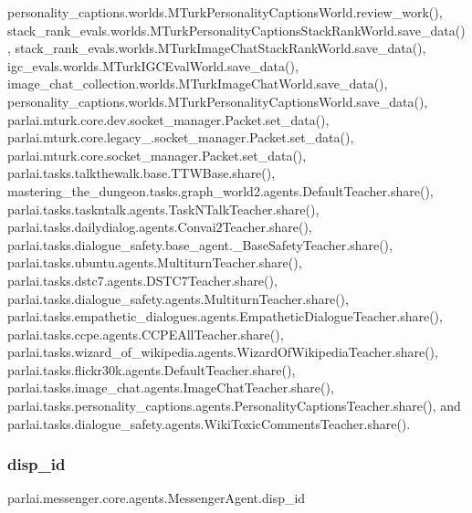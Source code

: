 personality\+\_\+captions.\+worlds.\+M\+Turk\+Personality\+Captions\+World.\+review\+\_\+work(), stack\+\_\+rank\+\_\+evals.\+worlds.\+M\+Turk\+Personality\+Captions\+Stack\+Rank\+World.\+save\+\_\+data(), stack\+\_\+rank\+\_\+evals.\+worlds.\+M\+Turk\+Image\+Chat\+Stack\+Rank\+World.\+save\+\_\+data(), igc\+\_\+evals.\+worlds.\+M\+Turk\+I\+G\+C\+Eval\+World.\+save\+\_\+data(), image\+\_\+chat\+\_\+collection.\+worlds.\+M\+Turk\+Image\+Chat\+World.\+save\+\_\+data(), personality\+\_\+captions.\+worlds.\+M\+Turk\+Personality\+Captions\+World.\+save\+\_\+data(), parlai.\+mturk.\+core.\+dev.\+socket\+\_\+manager.\+Packet.\+set\+\_\+data(), parlai.\+mturk.\+core.\+legacy\+\_.\+socket\+\_\+manager.\+Packet.\+set\+\_\+data(), parlai.\+mturk.\+core.\+socket\+\_\+manager.\+Packet.\+set\+\_\+data(), parlai.\+tasks.\+talkthewalk.\+base.\+T\+T\+W\+Base.\+share(), mastering\+\_\+the\+\_\+dungeon.\+tasks.\+graph\+\_\+world2.\+agents.\+Default\+Teacher.\+share(), parlai.\+tasks.\+taskntalk.\+agents.\+Task\+N\+Talk\+Teacher.\+share(), parlai.\+tasks.\+dailydialog.\+agents.\+Convai2\+Teacher.\+share(), parlai.\+tasks.\+dialogue\+\_\+safety.\+base\+\_\+agent.\+\_\+\+Base\+Safety\+Teacher.\+share(), parlai.\+tasks.\+ubuntu.\+agents.\+Multiturn\+Teacher.\+share(), parlai.\+tasks.\+dstc7.\+agents.\+D\+S\+T\+C7\+Teacher.\+share(), parlai.\+tasks.\+dialogue\+\_\+safety.\+agents.\+Multiturn\+Teacher.\+share(), parlai.\+tasks.\+empathetic\+\_\+dialogues.\+agents.\+Empathetic\+Dialogue\+Teacher.\+share(), parlai.\+tasks.\+ccpe.\+agents.\+C\+C\+P\+E\+All\+Teacher.\+share(), parlai.\+tasks.\+wizard\+\_\+of\+\_\+wikipedia.\+agents.\+Wizard\+Of\+Wikipedia\+Teacher.\+share(), parlai.\+tasks.\+flickr30k.\+agents.\+Default\+Teacher.\+share(), parlai.\+tasks.\+image\+\_\+chat.\+agents.\+Image\+Chat\+Teacher.\+share(), parlai.\+tasks.\+personality\+\_\+captions.\+agents.\+Personality\+Captions\+Teacher.\+share(), and parlai.\+tasks.\+dialogue\+\_\+safety.\+agents.\+Wiki\+Toxic\+Comments\+Teacher.\+share().

\mbox{\label{classparlai_1_1messenger_1_1core_1_1agents_1_1MessengerAgent_a34f9d8aa8209171eceac226c8aead2f7}} 
\subsubsection{\texorpdfstring{disp\+\_\+id}{disp\_id}}
{\footnotesize\ttfamily parlai.\+messenger.\+core.\+agents.\+Messenger\+Agent.\+disp\+\_\+id}



